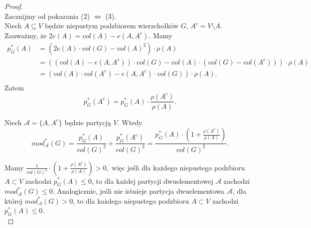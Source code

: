 \documentclass[letterpaper,12pt]{article}
\begin{document}
\begin{proof}
  \leavevmode\\
  \indent Zacznijmy od pokazania (2) \(\Leftrightarrow\) (3).\\

  \noindent Niech \(A \subseteq V\) będzie niepustym podzbiorem wierzchołków \(G\), \(A^c = V \setminus A\). Zauważmy, że \(2e(A) = vol(A) - e(A, A^c)\). Mamy
  \begin{align*}
    p_G^*(A) & = \left(2e(A) \cdot vol(G) - vol(A)^2\right)\cdot \rho(A)                                                            \\
             & = \left(\left(vol(A) - e(A, A^c)\right) \cdot vol(G) - vol(A) \cdot \left(vol(G)-vol(A^c)\right)\right)\cdot \rho(A) \\
             & = \left(vol(A) \cdot vol(A^c) - e(A, A^c) \cdot vol(G)\right)\cdot \rho(A).                                          \\
  \end{align*}
  Zatem
  \[
    p_G^*(A^c) = p_G^*(A)\cdot \frac{\rho(A^c)}{\rho(A)}.
  \]

  Niech \(\mathcal{A} = \{A, A^c\}\) będzie partycją \(V\). Wtedy
  \[mod_{\mathcal{A}}^*(G) = \frac{p_G^*(A)}{vol(G)^2} + \frac{p_G^*(A^c)}{vol(G)^2} = \frac{p_G^*(A)\cdot \left(1+\frac{\rho(A^c)}{\rho(A)}\right)}{vol(G)^2}.\]

  Mamy \(\frac{1}{vol(G)^2} \cdot \left(1+\frac{\rho(A^c)}{\rho(A)}\right) > 0,\) więc jeśli dla każdego niepustego podzbioru \(A \subset V\) zachodzi \(p_G^*(A) \leq 0\), to dla każdej partycji dwuelementowej \(\mathcal{A}\) zachodzi \(mod_{\mathcal{A}}^*(G) \leq 0\). Analogicznie, jeśli nie istnieje partycja dwuelementowa \(\mathcal{A}\), dla której \(mod_{\mathcal{A}}^*(G) > 0\), to dla każdego niepustego podzbioru \(A \subset V\) zachodzi \(p_G^*(A) \leq 0\).\\



\end{proof}
\end{document}
